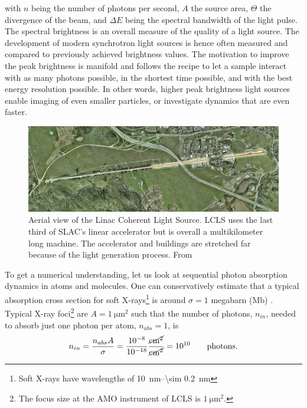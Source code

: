with $n$ being the number of photons per second, $A$ the source area, $\Theta$ the divergence of the beam, and $\Delta\! E$ being the spectral bandwidth of the light pulse. The spectral brightness is an overall measure of the quality of a light source. The development of modern synchrotron light sources is hence often measured and compared to previously achieved brightness values. The motivation to improve the peak brightness is manifold and follows the recipe to let a sample interact with as many photons possible, in the shortest time possible, and with the best energy resolution possible. In other words, higher peak brightness light sources enable imaging of even smaller particles, or investigate dynamics that are even faster.\\[1\baselineskip]
\begin{figure}[t]
	\centering
		\includegraphics[width=1.00\textwidth]{images/aerial-view-lcls.jpg}
	\caption[Aerial view of the Linac Coherent Light Source.]{Aerial view of the Linac Coherent Light Source. LCLS uses the last third of SLAC's linear accelerator but is overall a multikilometer long machine. The accelerator and buildings are stretched far because of the light generation process. From \citep{SLAC-2009-Flickr}}
	\label{fig:aerial-view-lcls}
\end{figure}
To get a numerical understanding, let us look at sequential photon absorption dynamics in atoms and molecules. One can conservatively estimate that a typical absorption cross section for soft X-rays\footnote{Soft X-rays have wavelengths of \SIrange{10}{\sim 0.2}{\nano\meter}} is around $\sigma = 1$ megabarn (Mb) \citep{Bucksbaum-2011-Book}. Typical X-ray foci\footnote{The focus size at the AMO instrument of LCLS is $\SI{1}{\micro\meter\squared}$.} are $A = \SI{1}{\micro\meter\squared}$ such that the number of photons, $n_{in}$, needed to absorb just one photon per atom, $n_{abs}=1$, is
\begin{equation}
n_{in} = \frac{n_{abs} A}{\sigma} = \frac{10^{-8}}{10^{-18}}\si[per-mode = fraction]{\cancel\square\centi\meter\per\cancel\square\centi\meter}=10^{10}\qquad \mathrm{photons.}
\label{eq:absorption-cross-section}
\end{equation}
